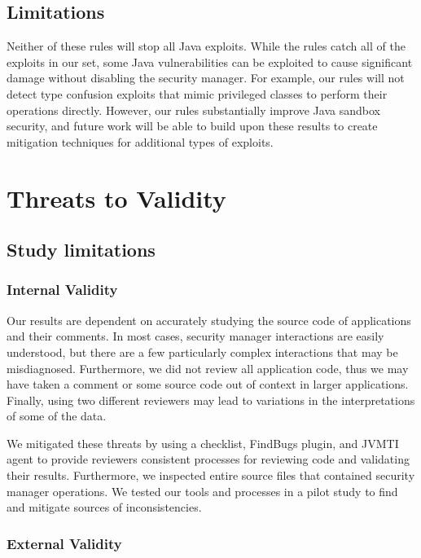 \documentclass{sig-alternate}
\begin{document}
\subsection{Limitations}

Neither of these rules will stop all Java exploits. While the rules
catch all of the exploits in our set, some Java vulnerabilities can
be exploited to cause significant damage without disabling the security
manager. For example, our rules will not detect type confusion exploits
that mimic privileged classes to perform their operations directly.
However, our rules substantially improve Java sandbox security, and
future work will be able to build upon these results to create mitigation
techniques for additional types of exploits.


\section{Threats to Validity}

\subsection{Study limitations}\label{sub:Limitations-Study}
\subsubsection{Internal Validity}

Our results are dependent on accurately studying the source code of
applications and their comments. In most cases, security manager interactions
are easily understood, but there are a few particularly complex interactions
that may be misdiagnosed. Furthermore, we did not review all application
code, thus we may have taken a comment or some source code out of
context in larger applications. Finally, using two different reviewers
may lead to variations in the interpretations of some of the data. 

We mitigated these threats by using a checklist, FindBugs plugin, and JVMTI agent to
provide reviewers consistent processes for reviewing code
and validating their results. Furthermore,
we inspected entire source files that contained
security manager operations. We tested our tools and processes in a pilot study
to find and mitigate sources of inconsistencies.

\subsubsection{External Validity}
\end{document}
